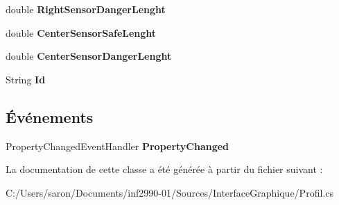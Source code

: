 \begin{DoxyCompactItemize}
\item 
\hypertarget{class_interface_graphique_1_1_profil_a4048eeedc86f14aaadc5db1e0b3f6494}{double {\bfseries Right\-Sensor\-Danger\-Lenght}}\label{class_interface_graphique_1_1_profil_a4048eeedc86f14aaadc5db1e0b3f6494}

\item 
\hypertarget{class_interface_graphique_1_1_profil_abd32d6ac539af3a7d63f83ced87973de}{double {\bfseries Center\-Sensor\-Safe\-Lenght}}\label{class_interface_graphique_1_1_profil_abd32d6ac539af3a7d63f83ced87973de}

\item 
\hypertarget{class_interface_graphique_1_1_profil_a365aeaf1a0f8630d8d11caef3550cb73}{double {\bfseries Center\-Sensor\-Danger\-Lenght}}\label{class_interface_graphique_1_1_profil_a365aeaf1a0f8630d8d11caef3550cb73}

\item 
\hypertarget{class_interface_graphique_1_1_profil_a4ced6cd383893d282d1a028658f7ae8c}{String {\bfseries Id}}\label{class_interface_graphique_1_1_profil_a4ced6cd383893d282d1a028658f7ae8c}

\end{DoxyCompactItemize}
\subsection*{Événements}
\begin{DoxyCompactItemize}
\item 
\hypertarget{class_interface_graphique_1_1_profil_a383ae710de275decac1e7b0338d91388}{Property\-Changed\-Event\-Handler {\bfseries Property\-Changed}}\label{class_interface_graphique_1_1_profil_a383ae710de275decac1e7b0338d91388}

\end{DoxyCompactItemize}


La documentation de cette classe a été générée à partir du fichier suivant \-:\begin{DoxyCompactItemize}
\item 
C\-:/\-Users/saron/\-Documents/inf2990-\/01/\-Sources/\-Interface\-Graphique/Profil.\-cs\end{DoxyCompactItemize}
